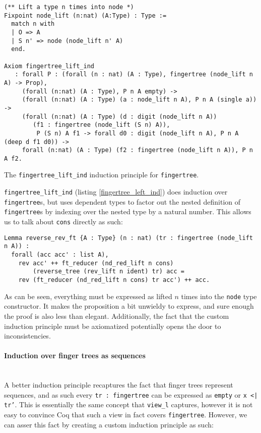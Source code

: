 \documentclass{article}
\newcommand{\code}[1]{\texttt{#1}}
\begin{document}
\begin{listing}[H]
\begin{verbatim}
(** Lift a type n times into node *)
Fixpoint node_lift (n:nat) (A:Type) : Type :=
  match n with
  | O => A
  | S n' => node (node_lift n' A)
  end.

Axiom fingertree_lift_ind
   : forall P : (forall (n : nat) (A : Type), fingertree (node_lift n A) -> Prop),
     (forall (n:nat) (A : Type), P n A empty) ->
     (forall (n:nat) (A : Type) (a : node_lift n A), P n A (single a)) ->
     (forall (n:nat) (A : Type) (d : digit (node_lift n A))
        (f1 : fingertree (node_lift (S n) A)),
         P (S n) A f1 -> forall d0 : digit (node_lift n A), P n A (deep d f1 d0)) ->
     forall (n:nat) (A : Type) (f2 : fingertree (node_lift n A)), P n A f2.
\end{verbatim}
\caption{The \code{fingertree\_lift\_ind} induction principle for \code{fingertree}.}
\label{fingertree_left_ind}
\end{listing}

\code{fingertree\_lift\_ind} (listing \ref{fingertree_left_ind})
does induction over \code{fingertree}s, but uses
dependent types to factor out the nested definition of \code{fingertree}s by
indexing over the nested type by a natural number. This allows us to talk
about \code{cons} directly as such:

\begin{verbatim}
Lemma reverse_rev_ft {A : Type} (n : nat) (tr : fingertree (node_lift n A)) :
  forall (acc acc' : list A),
    rev acc' ++ ft_reducer (nd_red_lift n cons)
        (reverse_tree (rev_lift n ident) tr) acc =
    rev (ft_reducer (nd_red_lift n cons) tr acc') ++ acc.
\end{verbatim}

As can be seen, everything must be expressed as lifted $n$ times into the
\code{node} type constructor. It makes the proposition a bit unwieldy to
express, and sure enough the proof is also less than elegant. Additionally,
the fact that the custom induction principle must be axiomatized potentially
opens the door to inconsistencies.

\paragraph{Induction over finger trees as sequences} \mbox{}\\
A better induction principle recaptures the fact that finger trees represent
sequences, and as such every \code{tr : fingertree} can be expressed as
\code{empty} or \code{x <| tr'}. This is essentially the same concept that
\code{view\_l} captures, however it is not easy to convince Coq that such
a view in fact covers \code{fingertree}. However, we can asser this fact by
creating a custom induction principle as such:
\end{document}
